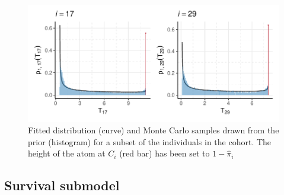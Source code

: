 \documentclass[
  10pt,
  a4paper,
]{article}
\begin{document}
\begin{figure}

{\centering \includegraphics{../plots/mimic-example/pf-prior-plot-small} 

}

\caption{Fitted distribution (curve) and Monte Carlo samples drawn from the prior (histogram) for a subset of the individuals in the cohort. The height of the atom at $C_{i}$ (red bar) has been set to $1 - \widehat{\pi}_{i}$}\label{fig:pf_prior_fit}
\end{figure}

\hypertarget{survival-submodel}{%
\subsection{Survival submodel}\label{survival-submodel}}
\end{document}
